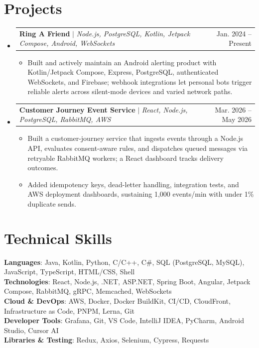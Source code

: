 \documentclass[letterpaper,11pt]{article}
\makeatletter
\newcommand{\resumeItem}[1]{
  \item\small{
    {#1 \vspace{-2pt}}
  }
}
\newcommand{\resumeProjectHeading}[2]{
    \item
    \begin{tabular*}{0.97\textwidth}{l@{\extracolsep{\fill}}r}
      \small#1 & #2 \\
    \end{tabular*}\vspace{-7pt}
}
\newcommand{\resumeSubHeadingListStart}{\begin{itemize}[leftmargin=0.15in, label={}]}
\newcommand{\resumeSubHeadingListEnd}{\end{itemize}}
\newcommand{\resumeItemListStart}{\begin{itemize}}
\newcommand{\resumeItemListEnd}{\end{itemize}\vspace{-5pt}}
\makeatother
\begin{document}
\section{Projects}
\resumeSubHeadingListStart
\resumeProjectHeading
{\textbf{Ring A Friend} $|$ \emph{Node.js, PostgreSQL, Kotlin, Jetpack Compose, Android, WebSockets}}{Jan. 2024 -- Present}
\resumeItemListStart
\resumeItem{Built and actively maintain an Android alerting product with Kotlin/Jetpack Compose, Express, PostgreSQL, authenticated WebSockets, and Firebase; webhook integrations let personal bots trigger reliable alerts across silent-mode devices and varied network paths.}
\resumeItemListEnd
\resumeProjectHeading
{\textbf{Customer Journey Event Service} $|$ \emph{React, Node.js, PostgreSQL, RabbitMQ, AWS}}{Mar. 2026 -- May 2026}
\resumeItemListStart
\resumeItem{Built a customer-journey service that ingests events through a Node.js API, evaluates consent-aware rules, and dispatches queued messages via retryable RabbitMQ workers; a React dashboard tracks delivery outcomes.}
\resumeItem{Added idempotency keys, dead-letter handling, integration tests, and AWS deployment dashboards, sustaining 1,000 events/min with under 1\% duplicate sends.}
\resumeItemListEnd
\resumeSubHeadingListEnd



%
\section{Technical Skills}
\begin{itemize}[leftmargin=0.15in, label={}]
  \small{\item{
        \textbf{Languages}{: Java, Kotlin, Python, C/C++, C\#, SQL (PostgreSQL, MySQL), JavaScript, TypeScript, HTML/CSS, Shell} \\
        \textbf{Technologies}{: React, Node.js, .NET, ASP.NET, Spring Boot, Angular, Jetpack Compose, RabbitMQ, gRPC, Memcached, WebSockets} \\
        \textbf{Cloud \& DevOps}{: AWS, Docker, Docker BuildKit, CI/CD, CloudFront, Infrastructure as Code, PNPM, Lerna, Git} \\
        \textbf{Developer Tools}{: Grafana, Git, VS Code, IntelliJ IDEA, PyCharm, Android Studio, Cursor AI} \\
        \textbf{Libraries \& Testing}{: Redux, Axios, Selenium, Cypress, Requests}
        }}
\end{itemize}


\end{document}

